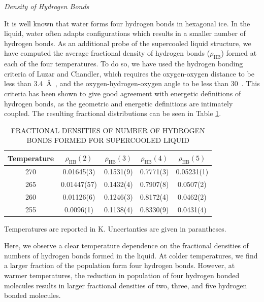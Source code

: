 \begin{flushleft}
\textit{Density of Hydrogen Bonds}
\end{flushleft}

It is well known that water forms four hydrogen bonds in hexagonal
ice. In the liquid, water often adapts configurations which results in
a smaller number of hydrogen bonds. As an additional probe of the
supercooled liquid structure, we have computed the average fractional
density of hydrogen bonds ($\rho_\mathrm{HB}$) formed at each of the
four temperatures. To do so, we have used the hydrogen bonding
criteria of Luzar and Chandler, which requires the oxygen-oxygen
distance to be less than 3.4~\AA~, and the oxygen-hydrogen-oxygen
angle to be less than 30\degree~.\cite{Luzar1996} This criteria has
been shown to give good agreement with energetic definitions of
hydrogen bonds, as the geometric and energetic definitions are
intimately coupled. The resulting fractional distributions can be seen
in Table \ref{tab:bulk_HB}.


\begin{table}[h] \centering \caption{FRACTIONAL DENSITIES OF NUMBER OF
    HYDROGEN BONDS FORMED FOR SUPERCOOLED LIQUID\label{tab:bulk_HB}}
\begin{tabular}{ccccc}
\hline
\hline
 Temperature & $\rho_\mathrm{HB}(2)$ & $\rho_\mathrm{HB}(3)$ & $\rho_\mathrm{HB}(4)$ & $\rho_\mathrm{HB}(5)$  \\
\hline
270 & 0.01645(3) & 0.1531(9) & 0.7771(3) & 0.05231(1)\\
265 & 0.01447(57) & 0.1432(4) & 0.7907(8) & 0.0507(2)\\
260 & 0.01126(6) & 0.1246(3) & 0.8172(4) & 0.0462(2)  \\
255 & 0.0096(1) & 0.1138(4) & 0.8330(9) & 0.0431(4) \\
\hline
\hline
\end{tabular}
\begin{flushleft}
Temperatures are reported in K. Uncertanties are given in parantheses.
\end{flushleft}
\end{table}

Here, we observe a clear temperature dependence on the fractional
densities of numbers of hydrogen bonds formed in the liquid. At colder
temperatures, we find a larger fraction of the population form four
hydrogen bonds. However, at warmer temperatures, the reduction in
population of four hydrogen bonded molecules results in larger
fractional densities of two, three, and five hydrogen bonded
molecules. 



